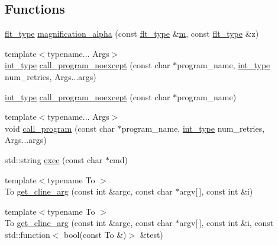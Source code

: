 \subsection*{Functions}
\begin{DoxyCompactItemize}
\item 
\hyperlink{lib_2IceBRG__main_2common_8h_ad0f130a56eeb944d9ef2692ee881ecc4}{flt\+\_\+type} \hyperlink{namespaceIceBRG_ab587729cb9260a99134b08c6c2225656}{magnification\+\_\+alpha} (const \hyperlink{lib_2IceBRG__main_2common_8h_ad0f130a56eeb944d9ef2692ee881ecc4}{flt\+\_\+type} \&\hyperlink{namespaceIceBRG_ada6365c5d16106f0608afbd34f010bcc}{m}, const \hyperlink{lib_2IceBRG__main_2common_8h_ad0f130a56eeb944d9ef2692ee881ecc4}{flt\+\_\+type} \&z)
\item 
{\footnotesize template$<$typename... Args$>$ }\\\hyperlink{lib_2IceBRG__main_2common_8h_ac4de9d9335536ac22821171deec8d39e}{int\+\_\+type} \hyperlink{namespaceIceBRG_a787c194c18a920c51d124701a10b099b}{call\+\_\+program\+\_\+noexcept} (const char $\ast$program\+\_\+name, \hyperlink{lib_2IceBRG__main_2common_8h_ac4de9d9335536ac22821171deec8d39e}{int\+\_\+type} num\+\_\+retries, Args...\+args)
\item 
\hyperlink{lib_2IceBRG__main_2common_8h_ac4de9d9335536ac22821171deec8d39e}{int\+\_\+type} \hyperlink{namespaceIceBRG_a12c66268892e5e8f2f380bf90faab6e4}{call\+\_\+program\+\_\+noexcept} (const char $\ast$program\+\_\+name)
\item 
{\footnotesize template$<$typename... Args$>$ }\\void \hyperlink{namespaceIceBRG_a705a3bbc26675b984251b60e8096c776}{call\+\_\+program} (const char $\ast$program\+\_\+name, \hyperlink{lib_2IceBRG__main_2common_8h_ac4de9d9335536ac22821171deec8d39e}{int\+\_\+type} num\+\_\+retries, Args...\+args)
\item 
std\+::string \hyperlink{namespaceIceBRG_aca768403716d346762c67bcadb91e583}{exec} (const char $\ast$cmd)
\item 
{\footnotesize template$<$typename To $>$ }\\To \hyperlink{namespaceIceBRG_a2bff5d916867d1b6ebeee4103079781f}{get\+\_\+cline\+\_\+arg} (const int \&argc, const char $\ast$argv\mbox{[}$\,$\mbox{]}, const int \&i)
\item 
{\footnotesize template$<$typename To $>$ }\\To \hyperlink{namespaceIceBRG_a5221e1eae3598f8a7231dad7024ca213}{get\+\_\+cline\+\_\+arg} (const int \&argc, const char $\ast$argv\mbox{[}$\,$\mbox{]}, const int \&i, const std\+::function$<$ bool(const To \&)$>$ \&test)

\end{DoxyCompactItemize}
